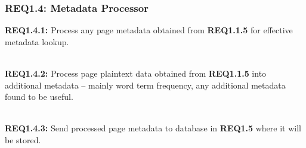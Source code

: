 \subsubsection{REQ1.4: Metadata Processor}

\textbf{REQ1.4.1:} Process any page metadata obtained from \textbf{REQ1.1.5} for effective metadata lookup.\par

\textbf{\\REQ1.4.2:} Process page plaintext data obtained from \textbf{REQ1.1.5} into additional metadata -- mainly word term frequency, any additional metadata found to be useful.\par

\textbf{\\REQ1.4.3:} Send processed page metadata to database in \textbf{REQ1.5} where it will be stored.\par
